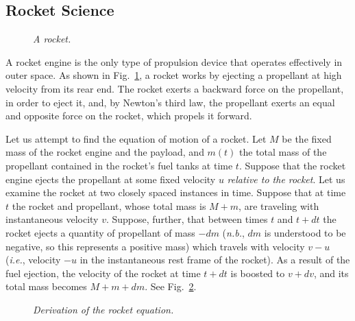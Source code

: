 \subsection{Rocket Science}
\begin{figure}
\epsfysize=2in
\centerline{}
\caption{\em A rocket.}\label{f51}  
\end{figure}
A rocket engine is the only type of propulsion device that operates
effectively in outer space. As shown in Fig.~\ref{f51}, a rocket works by ejecting a propellant at
high velocity from its rear end. The rocket exerts a backward force on the
propellant, in order to eject it, and, by Newton's third law, the propellant
exerts an equal and opposite force on the rocket, which propels it forward.

Let us attempt to find the equation of motion of a rocket. Let $M$ be the fixed mass of the
rocket engine and the payload, and  $m(t)$  the total mass of the propellant contained
in the rocket's fuel tanks at time $t$. Suppose that the rocket engine ejects the propellant
at some fixed velocity $u$ {\em relative to the rocket}. Let us examine the rocket at two
closely spaced instances in time. Suppose that at time $t$ the rocket and propellant, whose
total mass is $M+m$, are traveling with instantaneous velocity $v$. Suppose, further, that
between times $t$ and $t+dt$ the rocket  ejects a quantity of propellant of mass $-dm$ ({\em n.b.}, $dm$ 
is understood to be negative,
so this represents a positive mass) which travels with velocity $v-u$ ({\em i.e.}, velocity
$-u$ in the instantaneous rest frame of the rocket). As a result of the fuel
ejection, the velocity of the rocket
at time $t+dt$ is boosted to $v+dv$, and its total
mass becomes $M+m+dm$. See Fig.~\ref{f52}.

\begin{figure}
\epsfysize=2in
\centerline{}
\caption{\em Derivation of the rocket equation.}\label{f52}  
\end{figure}

